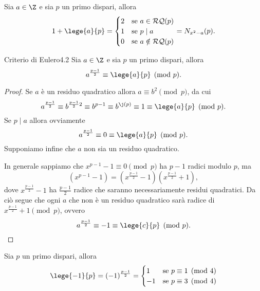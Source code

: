\begin{pr*}
	Sia \(a\in\Z\) e sia \(p\) un primo dispari, allora
	\[
		1+\lege{a}{p} = 	\begin{cases}
			2 & \text{se }a\in\mathcal{RQ}(p)    \\
			1 & \text{se }p\mid a                \\
			0 & \text{se }a\notin\mathcal{RQ}(p)
		\end{cases}
		= N_{x^2-a}(p).
	\]
\end{pr*}

\begin{teor}{Criterio di Eulero}{4.2}
	Sia \(a\in\Z\) e sia \(p\) un primo dispari, allora
	\[
		a^{\frac{p-1}{2}} \equiv \lege{a}{p} \pmod{p}.
	\]
\end{teor}

\begin{proof}
	Se \(a\) è un residuo quadratico allora \(a\equiv b^2 \pmod{p}\), da cui
	\[
		a^{\frac{p-1}{2}} \equiv b^{\frac{p-1}{2}2} \equiv b^{p-1} \equiv b^{\j(p)} \equiv 1 \equiv \lege{a}{p} \pmod{p}.
	\]
	Se \(p\mid a\) allora ovviamente
	\[
		a^{\frac{p-1}{2}} \equiv 0 \equiv \lege{a}{p} \pmod{p}.
	\]
	Supponiamo infine che \(a\) non sia un residuo quadratico.

	In generale sappiamo che \(x^{p-1}-1\equiv 0 \pmod{p}\) ha \(p-1\) radici modulo \(p\), ma
	\[
		(x^{p-1}-1) = (x^{\frac{p-1}{2}}-1)(x^{\frac{p-1}{2}}+1),
	\]
	dove \(x^{\frac{p-1}{2}}-1\) ha \(\frac{p-1}{2}\) radice che saranno necessariamente residui quadratici.
	Da ciò segue che ogni \(a\) che non è un residuo quadratico sarà radice di \(x^{\frac{p-1}{2}}+1 \pmod{p}\), ovvero
	\[
		a^{\frac{p-1}{2}} \equiv -1 \equiv \lege{c}{p} \pmod{p}.\qedhere
	\]
\end{proof}

\begin{cor}\label{th:4.3}
	Sia \(p\) un primo dispari, allora
	\[
		\lege{-1}{p} = (-1)^{\frac{p-1}{2}} = 	\begin{cases}
			1  & \text{se }p \equiv 1 \pmod{4} \\
			-1 & \text{se }p \equiv 3 \pmod{4}
		\end{cases}
	\]
\end{cor}

